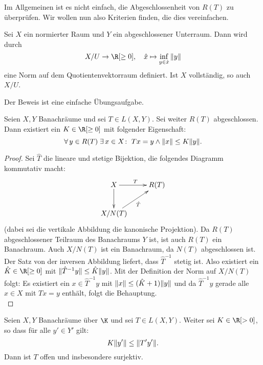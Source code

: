 Im Allgemeinen ist es nicht einfach, die Abgeschlossenheit von $R(T)$ zu
überprüfen. Wir wollen nun also Kriterien finden, die dies vereinfachen.

\begin{thSatz}
    Sei $X$ ein normierter Raum und $Y$ ein abgeschlossener Unterraum.
    Dann wird durch
    \[ X/U \to \R[\geq0], \quad \hat x \mapsto \inf_{y\in\hat x} \, \norm{y} \]
    eine Norm auf dem Quotientenvektorraum definiert. Ist $X$ vollständig, so
    auch $X/U$.
\end{thSatz}
%
Der Beweis ist eine einfache Übungsaufgabe.

\pagebreak[2]
\begin{thLemma} \label{vl11:lemma5.21}
    Seien $X,Y$ Banachräume und sei $T\in L(X,Y)$. Sei weiter $R(T)$
    abgeschlossen. Dann existiert ein $K\in\R[\geq0]$ mit folgender Eigenschaft:
    \[ \forall\,y\in R(T) \; \exists\, x\in X \colon \; Tx=y \wedge \lVert x\rVert\leq
        K\lVert y\rVert
    . \]
\end{thLemma}

\begin{proof}
    Sei $\hat T$ die lineare und stetige Bijektion, die folgendes Diagramm
    kommutativ macht:
    \begin{equation*}
        \begin{xy}
            \xymatrix{
                X \ar[r]^T \ar[d] & R(T)    \\
                X/N(T) \ar [ur]_{\hat T}
            }
        \end{xy}
    \end{equation*}
    (dabei sei die vertikale Abbildung die kanonische Projektion). Da $R(T)$
    abgeschlossener Teilraum des Banachraums $Y$ ist, ist auch $R(T)$ ein
    Banachraum. Auch $X/N(T)$ ist ein Banachraum, da $N(T)$ abgeschlossen ist.
    Der Satz von der inversen Abbildung 
    liefert, dass $\hat T^{-1}$ stetig ist. Also existiert ein $\hat
    K\in\R[\geq0]$ mit $\lVert\hat T^{-1}y\rVert \leq \hat K \lVert y\rVert$.
    Mit der Definition der Norm auf $X/N(T)$ folgt:
    Es existiert ein $x\in \hat T^{-1}y$ mit $\lVert x\rVert \leq (\hat K+1)
    \lVert y\rVert$ und da $\hat T^{-1}y$ gerade alle $x\in X$ mit $Tx=y$ enthält,
    folgt die Behauptung.
    \\
\end{proof}

\begin{thLemma} \label{vl11:lemma5.22}
    Seien $X,Y$ Banachräume über $\K$ und sei $T\in L(X,Y)$. Weiter sei
    $K\in\R[>0]$, so dass für alle $y'\in Y'$ gilt:
    \[ K \lVert y'\rVert \leq \lVert T'y'\rVert . \]
    Dann ist $T$ offen und insbesondere surjektiv.
\end{thLemma}

